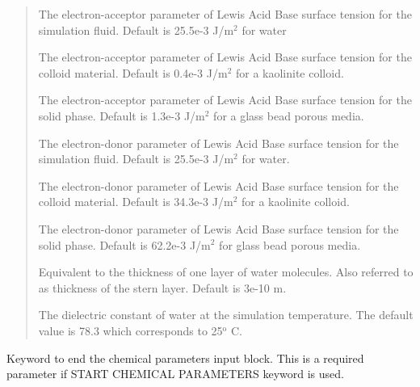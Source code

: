 \documentclass[letterpaper,10pt,english]{sphinxmanual}
\begin{document}
\begin{quote}
 The electron-acceptor parameter of Lewis
Acid Base surface tension for the simulation fluid. Default is
25.5e-3 J/m$^{\text{2}}$ for water

 The electron-acceptor parameter of
Lewis Acid Base surface tension for the colloid material. Default is
0.4e-3 J/m$^{\text{2}}$ for a kaolinite colloid.

 The electron-acceptor parameter of Lewis
Acid Base surface tension for the solid phase. Default is 1.3e-3
J/m$^{\text{2}}$ for a glass bead porous media.

 The electron-donor parameter of Lewis
Acid Base surface tension for the simulation fluid. Default is
25.5e-3 J/m$^{\text{2}}$ for water.

 The electron-donor parameter of Lewis
Acid Base surface tension for the colloid material. Default is
34.3e-3 J/m$^{\text{2}}$ for a kaolinite colloid.

 The electron-donor parameter of Lewis
Acid Base surface tension for the solid phase. Default is 62.2e-3
J/m$^{\text{2}}$ for glass bead porous media.

 Equivalent to the thickness of one layer
of water molecules. Also referred to as thickness of the stern
layer. Default is 3e-10 m.

 The dielectric constant of water at the
simulation temperature. The default value is 78.3 which corresponds
to 25$^{\text{o}}$ C.
\end{quote}

 Keyword to end the chemical parameters
input block. This is a required parameter if START CHEMICAL PARAMETERS
keyword is used.
\end{document}
